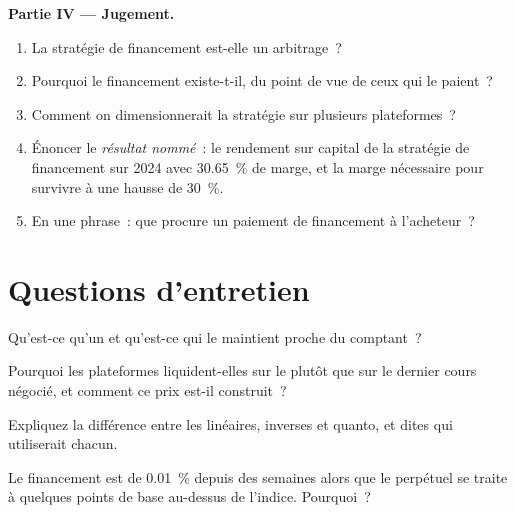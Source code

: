 \begin{problem}
\medskip\noindent\textbf{Partie IV --- Jugement.}
\begin{enumerate}[resume]
\item La stratégie de financement est-elle un arbitrage~?
\item Pourquoi le financement existe-t-il, du point de vue de ceux qui le paient~?
\item Comment on dimensionnerait la stratégie sur plusieurs plateformes~?
\item Énoncer le \emph{résultat nommé}~: le rendement sur capital de la stratégie de financement sur 2024 avec 30.65~\% de marge, et la
marge nécessaire pour survivre à une hausse de 30~\%.
\item En une phrase~: que procure un paiement de financement à l'acheteur~?
\end{enumerate}
\end{problem}

\section{Questions d'entretien}

\begin{interviewq}\label{iq:m3:perpetual-futures:1}
Qu'est-ce qu'un  et qu'est-ce qui le maintient proche du comptant~?
\end{interviewq}

\begin{interviewq}\label{iq:m3:perpetual-futures:2}
Pourquoi les plateformes liquident-elles sur le  plutôt que sur le dernier cours négocié, et comment ce prix est-il construit~?
\end{interviewq}

\begin{interviewq}\label{iq:m3:perpetual-futures:3}
Expliquez la différence entre les  linéaires, inverses et quanto, et dites qui utiliserait chacun.
\end{interviewq}

\begin{interviewq}\label{iq:m3:perpetual-futures:4}
Le financement est de 0.01~\% depuis des semaines alors que le perpétuel se traite à quelques points de base au-dessus de l'indice. Pourquoi~?
\end{interviewq}


